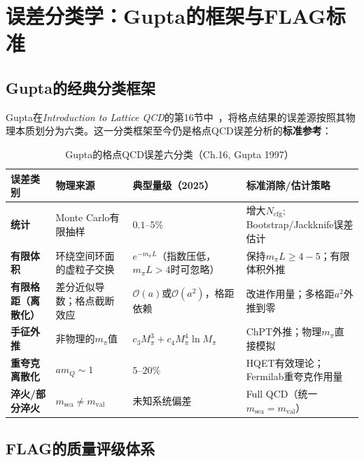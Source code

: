 \documentclass[12pt,a4paper]{ctexart}
\begin{document}
\section{误差分类学：Gupta的框架与FLAG标准}

\subsection{Gupta的经典分类框架}

Gupta在\textit{Introduction to Lattice QCD}的第16节中~\cite{Gupta1997intro}，将格点结果的误差源按照其物理本质划分为六类。这一分类框架至今仍是格点QCD误差分析的\textbf{标准参考}：

\begin{table}[H]
\centering
\caption{Gupta的格点QCD误差六分类（Ch.16, Gupta 1997）~\cite{Gupta1997intro}}
\label{tab:gupta_errors}
\small
\begin{tabular}{p{2.5cm}p{3.5cm}p{2.5cm}p{4.5cm}}
\toprule
\textbf{误差类别} & \textbf{物理来源} & \textbf{典型量级（2025）} & \textbf{标准消除/估计策略} \\
\midrule
\textbf{统计} &
Monte Carlo有限抽样 &
$0.1\text{--}5\%$ &
增大$N_{\text{cfg}}$; Bootstrap/Jackknife误差估计 \\
\textbf{有限体积} &
环绕空间环面的虚粒子交换 &
$e^{-m_\pi L}$（指数压低，$m_\pi L>4$时可忽略） &
保持$m_\pi L \ge 4-5$；有限体积外推 \\
\textbf{有限格距（离散化）} &
差分近似导数；格点截断效应 &
$\mathcal{O}(a)$或$\mathcal{O}(a^2)$，格距依赖 &
改进作用量；多格距$a^2$外推到零 \\
\textbf{手征外推} &
非物理的$m_\pi$值 &
$c_3 M_\pi^3 + c_4 M_\pi^4\ln M_\pi$ & ChPT外推；物理$m_\pi$直接模拟 \\
\textbf{重夸克离散化} &
$am_Q \sim 1$ &
$5\text{--}20\%$ &
HQET有效理论；Fermilab重夸克作用量 \\
\textbf{淬火/部分淬火} &
$m_{\text{sea}}\neq m_{\text{val}}$ &
未知系统偏差 &
Full QCD（统一$m_{\text{sea}} = m_{\text{val}}$） \\
\bottomrule
\end{tabular}
\end{table}

\subsection{FLAG的质量评级体系}
\end{document}

